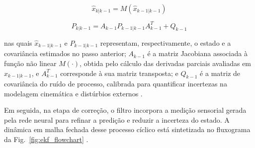 \begin{equation}
\hat{x}_{k|k-1} = M(\hat{x}_{k-1|k-1})
\label{eq:ekf_state_prediction}
\end{equation}

\begin{equation}
P_{k|k-1} = A_{k-1} P_{k-1|k-1} A_{k-1}^{T} + Q_{k-1}
\label{eq:ekf_cov_prediction}
\end{equation}

\noindent nas quais $\hat{x}_{k-1|k-1}$ e $P_{k-1|k-1}$ representam, respectivamente, o estado e a covariância estimados no passo anterior; $A_{k-1}$ é a matriz Jacobiana associada à função não linear $M(\cdot)$, obtida pelo cálculo das derivadas parciais avaliadas em $\hat{x}_{k-1|k-1}$, e $A_{k-1}^{T}$ corresponde à sua matriz transposta; e $Q_{k-1}$ é a matriz de covariância do ruído de processo, calibrada para quantificar incertezas na modelagem cinemática e distúrbios externos \cite{kalman_beginners}.

Em seguida, na etapa de correção, o filtro incorpora a medição sensorial gerada pela rede neural para refinar a predição e reduzir a incerteza do estado. A dinâmica em malha fechada desse processo cíclico está sintetizada no fluxograma da Fig.~\ref{fig:ekf_flowchart} \cite{kalman_beginners}.

